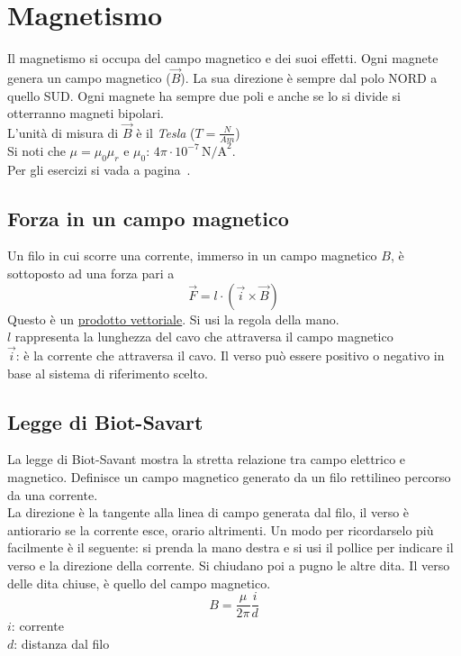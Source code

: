 
\section{Magnetismo}\label{sec:magnetismo}
Il magnetismo si occupa del campo magnetico e dei suoi effetti. Ogni magnete genera un
campo magnetico ($\vec{B}$). La sua direzione è sempre dal polo NORD a quello SUD\@. Ogni magnete ha
sempre due poli e anche se lo si divide si otterranno magneti bipolari.\\ 
L'unità di misura di $\vec{B}$ è il \emph{Tesla} ($T = \frac{N}{Am}$)\\
Si noti che $\mu = \mu_0\mu_r$ e \hyperref[tab:mu0]{$\mu_0$}: $4\pi\cdot10^{-7}\,\text{N/A}^2$.\\
Per gli esercizi si vada a pagina~\pageref{ex:magnetismo}.

\subsection{Forza in un campo magnetico}
Un filo in cui scorre una corrente, immerso in un campo magnetico $B$, è sottoposto ad una forza
pari a
\begin{equation*}	
  \vec{F} = l\cdot(\vec{i}\times\vec{B})
\end{equation*}
Questo è un \hyperref[subsec:vettori:prodottoVettoriale]{prodotto vettoriale}. Si usi la regola
della mano.\\
$l$ rappresenta la lunghezza del cavo che attraversa il campo magnetico\\
$\vec{i}$: è la corrente che attraversa il cavo. Il verso può essere positivo o
negativo in base al sistema di riferimento scelto.

\subsection{Legge di Biot-Savart}
La legge di Biot-Savant mostra la stretta relazione tra campo elettrico e magnetico. Definisce un 
campo magnetico generato da un filo rettilineo percorso da una corrente.\\
La direzione è la tangente alla linea di campo generata dal filo, il verso è antiorario se la
corrente esce, orario altrimenti. Un modo per ricordarselo più facilmente è il seguente: si prenda la
mano destra e si usi il pollice per indicare il verso e la direzione della corrente. Si chiudano poi
a pugno le altre dita. Il verso delle dita chiuse, è quello del campo magnetico.
\begin{equation*}
  B = \frac{\mu}{2\pi}\frac{i}{d}
\end{equation*}
$i$: corrente\\
$d$: distanza dal filo\\ [\baselineskip]

